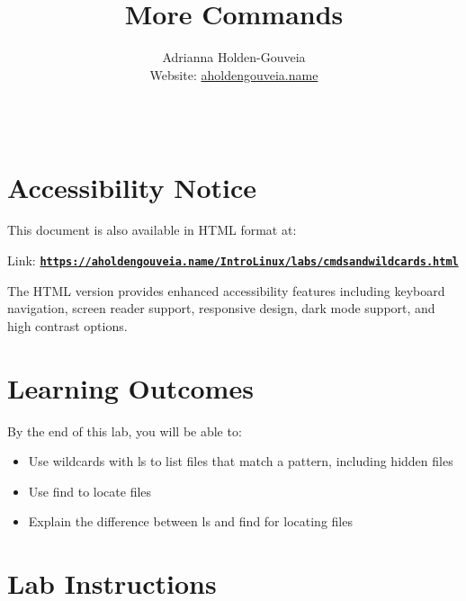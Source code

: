 \documentclass[12pt]{article}
\title{More Commands}
\author{
        Adrianna Holden-Gouveia \\
        Website: \href{https://aholdengouveia.name}{aholdengouveia.name}\\ 
        \date{\vspace{-5ex}}
        \faGithub {: aholdengouveia} \\
        }
\begin{document}
    

\maketitle

\section*{Accessibility Notice}
This document is also available in HTML format at:

Link: \href{https://aholdengouveia.name/IntroLinux/labs/cmdsandwildcards.html}{\textbf{\nolinkurl{https://aholdengouveia.name/IntroLinux/labs/cmdsandwildcards.html}}}

The HTML version provides enhanced accessibility features including keyboard navigation, screen reader support, responsive design, dark mode support, and high contrast options.



\section*{Learning Outcomes}
By the end of this lab, you will be able to:
\begin{itemize}
    \item Use wildcards with ls to list files that match a pattern, including hidden files
    \item Use find to locate files
    \item Explain the difference between ls and find for locating files
\end{itemize}
\section*{Lab Instructions}
\end{document}
